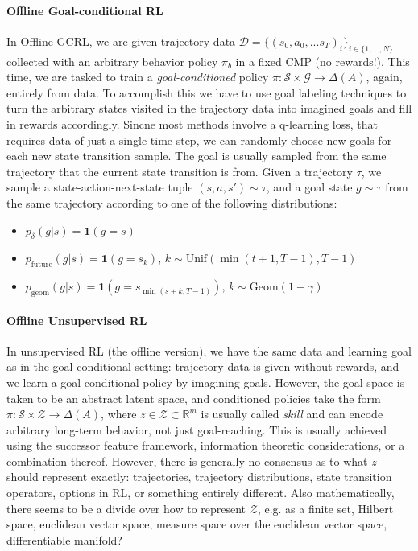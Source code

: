 \documentclass{article}
\theoremstyle{plain}
\theoremstyle{definition}
\theoremstyle{remark}
\newcommand{\sS}{\mathcal{S}}
\newcommand{\dist}[1]{\Delta({#1})}
\begin{document}
\paragraph{Offline Goal-conditional RL} In Offline GCRL, we are given trajectory data $\mathcal{D} = \{(s_0,a_0, ...s_T)_i\}_{i\in\{1,...,N\}}$ collected with an arbitrary behavior policy $\pi_b$ in a fixed CMP (no rewards!). This time, we are tasked to train a \textit{goal-conditioned} policy $\pi:\sS\times\mathcal{G} \to \dist A$, again, entirely from data. To accomplish this we have to use goal labeling techniques to turn the arbitrary states visited in the trajectory data into imagined goals and fill in rewards accordingly. Sincne most methods involve a q-learning loss, that requires data of just a single time-step, we can randomly choose new goals for each new state transition sample. The goal is usually sampled from the same trajectory that the current state transition is from. Given a trajectory $\tau$, we sample a state-action-next-state tuple $(s,a,s')\sim\tau$, and a goal state $g\sim\tau$ from the same trajectory according to one of the following distributions:
\begin{itemize}
    \item $p_\delta(g|s) = \mathbf{1}(g=s)$
    \item $p_\mathrm{future}(g|s) = \mathbf{1}(g=s_k)$, $k\sim\mathrm{Unif}(\min(t+1,T-1), T-1)$
    \item $p_\mathrm{geom}(g|s) = \mathbf{1}(g=s_{\min(s+k, T-1)})$, $k\sim\mathrm{Geom}(1-\gamma)$
\end{itemize}

\paragraph{Offline Unsupervised RL} In unsupervised RL (the offline version), we have the same data and learning goal as in the goal-conditional setting: trajectory data is given without rewards, and we learn a goal-conditional policy by imagining goals. However, the goal-space is taken to be an abstract latent space, and conditioned policies take the form $\pi:\sS\times\mathcal{Z} \to \dist A$, where $z\in\mathcal{Z}\subset\mathbb{R}^m$ is usually called \textit{skill} and can encode arbitrary long-term behavior, not just goal-reaching. This is usually achieved using the successor feature framework, information theoretic considerations, or a combination thereof. However, there is generally no consensus as to what $z$ should represent exactly: trajectories, trajectory distributions, state transition operators, options in RL, or something entirely different. Also mathematically, there seems to be a divide over how to represent $\mathcal{Z}$, e.g. as a finite set, Hilbert space, euclidean vector space, measure space over the euclidean vector space, differentiable manifold?
\end{document}
